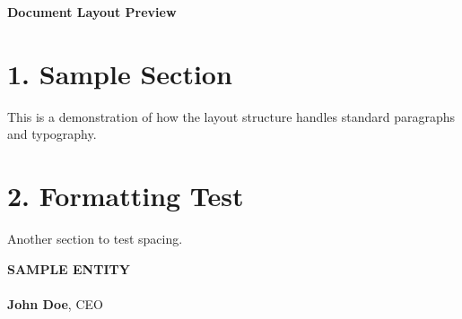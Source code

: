 \documentclass[10pt,letterpaper]{article}
\begin{document}
\begin{center}
\LARGE\textbf{Document Layout Preview}
\end{center}
\vspace{1.5em}

\section*{1. Sample Section}
This is a demonstration of how the layout structure handles standard paragraphs and typography.

\section*{2. Formatting Test}
Another section to test spacing.

\vspace{4em}
\noindent
\noindent
\textbf{\textcolor{BrandPrimary}{SAMPLE ENTITY}}\\[1em]
\hrulefill \\
\textbf{John Doe}, CEO
\end{document}
